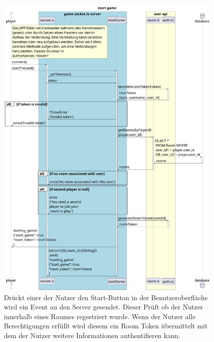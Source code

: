 \documentclass[
]{article}
\begin{document}
\begin{figure}[H]
	\centering
	\includegraphics[width=\textwidth ]{resources/start_game.pdf}
	\caption{Drückt einer der Nutzer den Start-Button in der Benutzeroberfläche wird ein Event an den Server gesendet. Dieser Prüft ob der Nutzer innerhalb eines Raumes regestriert wurde. Wenn der Nutzer alle Berechtigungen erfüllt wird diesem ein Room Token übermittelt mit dem der Nutzer weitere Informationen authentifieren kann.}
	\label{fig:ablaufdiagramm-start_game}
\end{figure}
\end{document}
